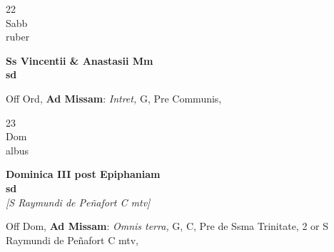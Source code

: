 \documentclass[10pt, openany]{book}
\begin{document}
        \begin{center}
            \begin{minipage}{3.5in}
                \vspace{2em}
                \begin{minipage}{0.5in}
                    {\Huge 22} \\
                    {\normalsize Sabb} \\
                    {\normalsize ruber}
                \end{minipage}
                \begin{minipage}{3.0in}
                    \textbf{ \large Ss Vincentii \& Anastasii Mm \\
                    \textnormal{\normalsize sd}} \\ 
                \end{minipage}
                \begin{justify}Off Ord, \textbf{Ad Missam}: \textit{Intret,} G, Pre Communis,   
                \end{justify}
            \end{minipage}
        \end{center}
    
        \begin{center}
            \begin{minipage}{3.5in}
                \vspace{2em}
                \begin{minipage}{0.5in}
                    {\Huge 23} \\
                    {\normalsize Dom} \\
                    {\normalsize albus}
                \end{minipage}
                \begin{minipage}{3.0in}
                    \textbf{ \large Dominica III post Epiphaniam \\
                    \textnormal{\normalsize sd}} \\ \textit{[S Raymundi de Peñafort C mtv]} \\ 
                \end{minipage}
                \begin{justify}Off Dom, \textbf{Ad Missam}: \textit{Omnis terra,} G, C, Pre de Ssma Trinitate, 2 or S Raymundi de Peñafort C mtv,   
                \end{justify}
            \end{minipage}
        \end{center}
    
\end{document}
